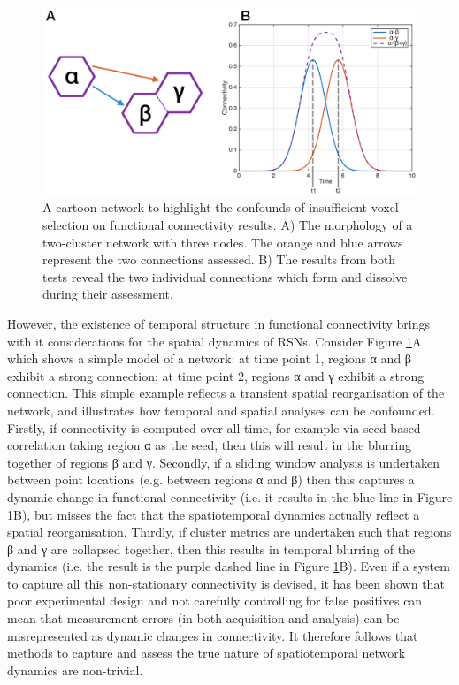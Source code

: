 \begin{figure}
	\begin{center}
		\includegraphics[width=\linewidth]{./images/chapter3/fig_conn_2.png}
		\caption{A cartoon network to highlight the confounds of insufficient voxel selection on functional connectivity results. A) The morphology of a two-cluster network with three nodes. The orange and blue arrows represent the two connections assessed. B) The results from both tests reveal the two individual connections which form and dissolve during their assessment.}\label{fig_3_b}
	\end{center}
\end{figure}

However, the existence of temporal structure in functional connectivity brings with it considerations for the spatial dynamics of RSNs. Consider Figure \ref{fig_3_b}A which shows a simple model of a network: at time point 1, regions α and β exhibit a strong connection; at time point 2, regions α and γ exhibit a strong connection. This simple example reflects a transient spatial reorganisation of the network, and illustrates how temporal and spatial analyses can be confounded. Firstly, if connectivity is computed over all time, for example via seed based correlation taking region α as the seed, then this will result in the blurring together of regions β and γ. Secondly, if a sliding window analysis is undertaken between point locations (e.g. between regions α and β) then this captures a dynamic change in functional connectivity (i.e. it results in the blue line in Figure \ref{fig_3_b}B), but misses the fact that the spatiotemporal dynamics actually reflect a spatial reorganisation. Thirdly, if cluster metrics are undertaken such that regions β and γ are collapsed together, then this results in temporal blurring of the dynamics (i.e. the result is the purple dashed line in Figure \ref{fig_3_b}B). Even if a system to capture all this non-stationary connectivity is devised, it has been shown that poor experimental design and not carefully controlling for false positives can mean that measurement errors (in both acquisition and analysis) can be misrepresented as dynamic changes in connectivity. It therefore follows that methods to capture and assess the true nature of spatiotemporal network dynamics are non-trivial.

